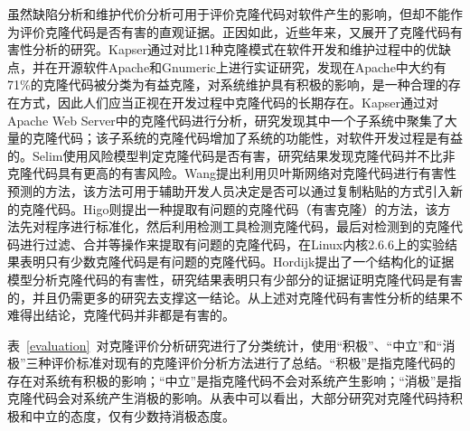 虽然缺陷分析和维护代价分析可用于评价克隆代码对软件产生的影响，但却不能作为评价克隆代码是否有害的直观证据。正因如此，近些年来，又展开了克隆代码有害性分析的研究。Kapser通过对比11种克隆模式在软件开发和维护过程中的优缺点，并在开源软件Apache和Gnumeric上进行实证研究，发现在Apache中大约有71\%的克隆代码被分类为有益克隆，对系统维护具有积极的影响，是一种合理的存在方式，因此人们应当正视在开发过程中克隆代码的长期存在\cite{kapser2006cloning,kapser2008cloning}。Kapser通过对Apache Web Server中的克隆代码进行分析，研究发现其中一个子系统中聚集了大量的克隆代码；该子系统的克隆代码增加了系统的功能性，对软件开发过程是有益的\cite{kapser2006supporting}。Selim使用风险模型判定克隆代码是否有害，研究结果发现克隆代码并不比非克隆代码具有更高的有害风险\cite{selim2010studying}。Wang提出利用贝叶斯网络对克隆代码进行有害性预测的方法\cite{wang2012can}，该方法可用于辅助开发人员决定是否可以通过复制粘贴的方式引入新的克隆代码。Higo则提出一种提取有问题的克隆代码（有害克隆）的方法，该方法先对程序进行标准化，然后利用检测工具检测克隆代码，最后对检测到的克隆代码进行过滤、合并等操作来提取有问题的克隆代码，在Linux内核2.6.6上的实验结果表明只有少数克隆代码是有问题的克隆代码\cite{higo2009problematic}。Hordijk提出了一个结构化的证据模型分析克隆代码的有害性，研究结果表明只有少部分的证据证明克隆代码是有害的，并且仍需更多的研究去支撑这一结论\cite{hordijk2009harmfulness}。从上述对克隆代码有害性分析的结果不难得出结论，克隆代码并非都是有害的。

表~\ref{evaluation}~对克隆评价分析研究进行了分类统计，使用“积极”、“中立”和“消极”三种评价标准对现有的克隆评价分析方法进行了总结。“积极”是指克隆代码的存在对系统有积极的影响；“中立”是指克隆代码不会对系统产生影响；“消极”是指克隆代码会对系统产生消极的影响。从表中可以看出，大部分研究对克隆代码持积极和中立的态度，仅有少数持消极态度。%

